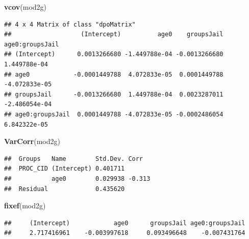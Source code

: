 \documentclass[ignorenonframetext,]{beamer}
\newenvironment{Shaded}{\begin{snugshade}}{\end{snugshade}}
\newcommand{\KeywordTok}[1]{\textcolor[rgb]{0.13,0.29,0.53}{\textbf{{#1}}}}
\newcommand{\NormalTok}[1]{{#1}}
\begin{document}
\begin{frame}[fragile]

\small

\begin{Shaded}
\begin{Highlighting}[]
\KeywordTok{vcov}\NormalTok{(mod2g)}
\end{Highlighting}
\end{Shaded}

\begin{verbatim}
## 4 x 4 Matrix of class "dpoMatrix"
##                   (Intercept)          age0    groupsJail age0:groupsJail
## (Intercept)      0.0013266680 -1.449788e-04 -0.0013266680    1.449788e-04
## age0            -0.0001449788  4.072833e-05  0.0001449788   -4.072833e-05
## groupsJail      -0.0013266680  1.449788e-04  0.0023287011   -2.486054e-04
## age0:groupsJail  0.0001449788 -4.072833e-05 -0.0002486054    6.842322e-05
\end{verbatim}

\end{frame}

\begin{frame}[fragile]

\small

\begin{Shaded}
\begin{Highlighting}[]
\KeywordTok{VarCorr}\NormalTok{(mod2g)}
\end{Highlighting}
\end{Shaded}

\begin{verbatim}
##  Groups   Name        Std.Dev. Corr  
##  PROC_CID (Intercept) 0.401711       
##           age0        0.029938 -0.313
##  Residual             0.435620
\end{verbatim}

\end{frame}

\begin{frame}[fragile]

\small

\begin{Shaded}
\begin{Highlighting}[]
\KeywordTok{fixef}\NormalTok{(mod2g)}
\end{Highlighting}
\end{Shaded}

\begin{verbatim}
##     (Intercept)            age0      groupsJail age0:groupsJail 
##     2.717416961    -0.003997618     0.093496648    -0.007431764
\end{verbatim}

\end{frame}
\end{document}
